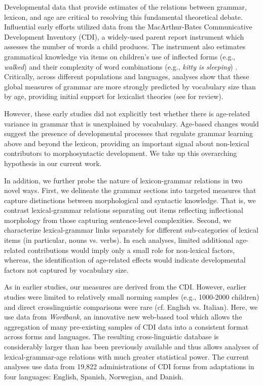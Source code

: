 \documentclass[10pt,letterpaper]{article}
\begin{document}
Developmental data that provide estimates of the relations between grammar, lexicon, and age are critical to resolving this fundamental theoretical debate.  Influential early efforts utilized data from the MacArthur-Bates Communicative Development Inventory (CDI), a widely-used parent report instrument which assesses the number of words a child produces.  The instrument also estimates grammatical knowledge via items on children's use of inflected forms (e.g., \emph{walked}) and their complexity of word combinations (e.g., \emph{kitty is sleeping}) \cite{bates1997,caselli1999}. Critically, across different populations and languages, analyses show that these global measures of grammar are more strongly predicted by vocabulary size than by age, providing initial support for lexicalist theories (see \cite{bates1999} for review).


However, these early studies did not explicitly test whether there is age-related variance in grammar that is unexplained by vocabulary. Age-based changes would suggest the presence of developmental processes that regulate grammar learning above and beyond the lexicon, providing an important signal about non-lexical contributors to morphosyntactic development.  We take up this overarching hypothesis in our current work. 

In addition, we further probe the nature of lexicon-grammar relations in two novel ways.  First, we delineate the grammar sections into targeted measures that capture distinctions between morphological and syntactic knowledge. That is, we contrast lexical-grammar relations separating out items reflecting inflectional morphology from those capturing sentence-level complexities. Second, we characterize lexical-grammar links separately for different sub-categories of lexical items (in particular, nouns vs. verbs).  In each analyses, limited additional age-related contributions would imply only a small role for non-lexical factors, whereas, the identification of age-related effects would indicate developmental factors not captured by vocabulary size.

As in earlier studies, our measures are derived from the CDI. However, earlier studies were limited to relatively small norming samples (e.g., 1000-2000 children) and direct crosslinguistic comparisons were rare (cf. English vs. Italian). Here, we use data from \emph{Wordbank}, an innovative new web-based tool which allows the aggregation of many pre-existing samples of CDI data into a consistent format across forms and languages. The resulting cross-linguistic database is considerably larger than has been previously available and thus allows analyses of lexical-grammar-age relations with much greater statistical power.  The current analyses use data from 19,822 administrations of CDI forms from adaptations in four languages: English, Spanish, Norwegian, and Danish.   
\end{document}
